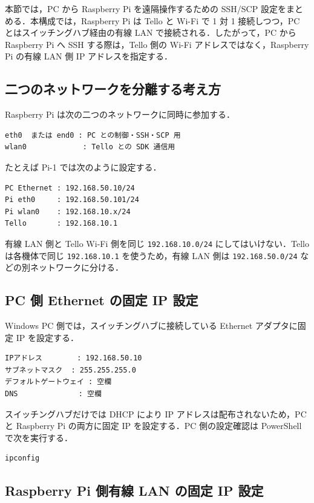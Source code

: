 本節では，PC から Raspberry Pi を遠隔操作するための SSH/SCP 設定をまとめる．本構成では，Raspberry Pi は Tello と Wi-Fi で 1 対 1 接続しつつ，PC とはスイッチングハブ経由の有線 LAN で接続される．したがって，PC から Raspberry Pi へ SSH する際は，Tello 側の Wi-Fi アドレスではなく，Raspberry Pi の有線 LAN 側 IP アドレスを指定する．

\subsection{二つのネットワークを分離する考え方}

Raspberry Pi は次の二つのネットワークに同時に参加する．

\begin{lstlisting}
eth0  または end0 : PC との制御・SSH・SCP 用
wlan0             : Tello との SDK 通信用
\end{lstlisting}

たとえば Pi-1 では次のように設定する．

\begin{lstlisting}
PC Ethernet : 192.168.50.10/24
Pi eth0     : 192.168.50.101/24
Pi wlan0    : 192.168.10.x/24
Tello       : 192.168.10.1
\end{lstlisting}

有線 LAN 側と Tello Wi-Fi 側を同じ \texttt{192.168.10.0/24} にしてはいけない．Tello は各機体で同じ \texttt{192.168.10.1} を使うため，有線 LAN 側は \texttt{192.168.50.0/24} などの別ネットワークに分ける．

\subsection{PC 側 Ethernet の固定 IP 設定}

Windows PC 側では，スイッチングハブに接続している Ethernet アダプタに固定 IP を設定する．

\begin{lstlisting}
IPアドレス        : 192.168.50.10
サブネットマスク  : 255.255.255.0
デフォルトゲートウェイ : 空欄
DNS              : 空欄
\end{lstlisting}

スイッチングハブだけでは DHCP により IP アドレスは配布されないため，PC と Raspberry Pi の両方に固定 IP を設定する．PC 側の設定確認は PowerShell で次を実行する．

\begin{lstlisting}
ipconfig
\end{lstlisting}

\subsection{Raspberry Pi 側有線 LAN の固定 IP 設定}

